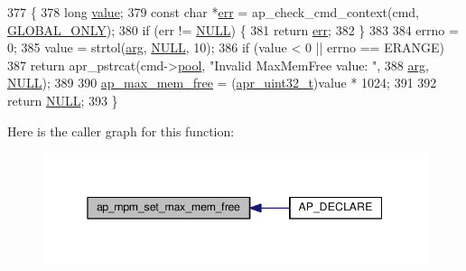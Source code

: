 \begin{DoxyCode}
377 \{
378     \textcolor{keywordtype}{long} \hyperlink{group__apr__env_ga711ebc0efad43aba10f32ded4a28cf17}{value};
379     \textcolor{keyword}{const} \textcolor{keywordtype}{char} *\hyperlink{group__AP__EXPR_gaccebe6c638c552d2845014cf8bdea8d8}{err} = ap\_check\_cmd\_context(cmd, \hyperlink{group__ap__check__cmd__context_ga8f2f401b1d57a151c5ba871088ba097e}{GLOBAL\_ONLY});
380     \textcolor{keywordflow}{if} (err != \hyperlink{pcre_8txt_ad7f989d16aa8ca809a36bc392c07fba1}{NULL}) \{
381         \textcolor{keywordflow}{return} \hyperlink{group__AP__EXPR_gaccebe6c638c552d2845014cf8bdea8d8}{err};
382     \}
383 
384     errno = 0;
385     value = strtol(\hyperlink{group__APACHE__CORE__LISTEN_ga71f9d4c76ff7cd8f3db5697a5cfa7b08}{arg}, \hyperlink{pcre_8txt_ad7f989d16aa8ca809a36bc392c07fba1}{NULL}, 10);
386     \textcolor{keywordflow}{if} (value < 0 || errno == ERANGE)
387         \textcolor{keywordflow}{return} apr\_pstrcat(cmd->\hyperlink{structcmd__parms__struct_a70b586677914245741baf62bc3cd57b8}{pool}, \textcolor{stringliteral}{"Invalid MaxMemFree value: "},
388                            \hyperlink{group__APACHE__CORE__LISTEN_ga71f9d4c76ff7cd8f3db5697a5cfa7b08}{arg}, \hyperlink{pcre_8txt_ad7f989d16aa8ca809a36bc392c07fba1}{NULL});
389 
390     \hyperlink{group__APACHE__MPM_gaaa1d8831ca72b470dd2b7d43fa8393d6}{ap\_max\_mem\_free} = (\hyperlink{group__apr__platform_ga558548a135d8a816c4787250744ea147}{apr\_uint32\_t})value * 1024;
391 
392     \textcolor{keywordflow}{return} \hyperlink{pcre_8txt_ad7f989d16aa8ca809a36bc392c07fba1}{NULL};
393 \}
\end{DoxyCode}


Here is the caller graph for this function\+:
\nopagebreak
\begin{figure}[H]
\begin{center}
\leavevmode
\includegraphics[width=345pt]{group__APACHE__MPM_ga9e680e753ab3ba857ab770beb8985738_icgraph}
\end{center}
\end{figure}


